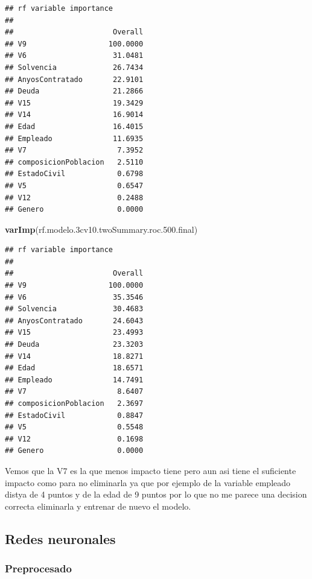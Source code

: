 \documentclass[
]{article}
\newenvironment{Shaded}{\begin{snugshade}}{\end{snugshade}}
\newcommand{\FloatTok}[1]{\textcolor[rgb]{0.00,0.00,0.81}{#1}}
\newcommand{\FunctionTok}[1]{\textcolor[rgb]{0.13,0.29,0.53}{\textbf{#1}}}
\newcommand{\NormalTok}[1]{#1}
\begin{document}
\begin{verbatim}
## rf variable importance
## 
##                       Overall
## V9                   100.0000
## V6                    31.0481
## Solvencia             26.7434
## AnyosContratado       22.9101
## Deuda                 21.2866
## V15                   19.3429
## V14                   16.9014
## Edad                  16.4015
## Empleado              11.6935
## V7                     7.3952
## composicionPoblacion   2.5110
## EstadoCivil            0.6798
## V5                     0.6547
## V12                    0.2488
## Genero                 0.0000
\end{verbatim}

\begin{Shaded}
\begin{Highlighting}[]
\FunctionTok{varImp}\NormalTok{(rf.modelo}\FloatTok{.3}\NormalTok{cv10.twoSummary.roc.}\FloatTok{500.}\NormalTok{final)}
\end{Highlighting}
\end{Shaded}

\begin{verbatim}
## rf variable importance
## 
##                       Overall
## V9                   100.0000
## V6                    35.3546
## Solvencia             30.4683
## AnyosContratado       24.6043
## V15                   23.4993
## Deuda                 23.3203
## V14                   18.8271
## Edad                  18.6571
## Empleado              14.7491
## V7                     8.6407
## composicionPoblacion   2.3697
## EstadoCivil            0.8847
## V5                     0.5548
## V12                    0.1698
## Genero                 0.0000
\end{verbatim}

Vemos que la V7 es la que menos impacto tiene pero aun asi tiene el
suficiente impacto como para no eliminarla ya que por ejemplo de la
variable empleado distya de 4 puntos y de la edad de 9 puntos por lo que
no me parece una decision correcta eliminarla y entrenar de nuevo el
modelo.

\hypertarget{redes-neuronales}{%
\subsection{Redes neuronales}\label{redes-neuronales}}

\hypertarget{preprocesado}{%
\subsubsection{Preprocesado}\label{preprocesado}}
\end{document}
